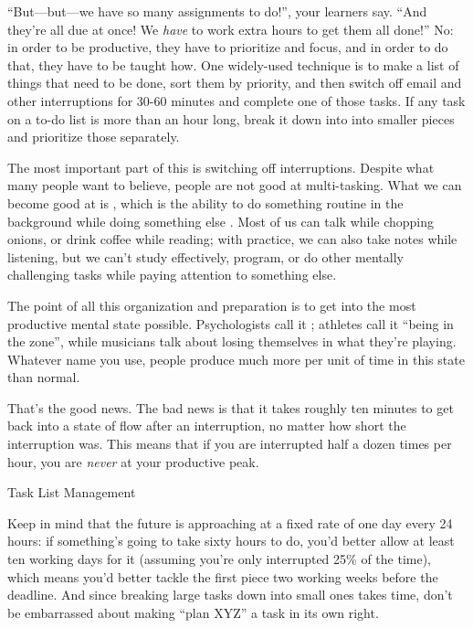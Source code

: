 ``But---but---we have so many assignments to do!'', your learners say.
``And they're all due at once!  We \emph{have} to work extra hours to
get them all done!''  No: in order to be productive, they have to
prioritize and focus, and in order to do that, they have to be taught
how.  One widely-used technique is to make a list of things that need
to be done, sort them by priority, and then switch off email and other
interruptions for 30-60 minutes and complete one of those tasks.  If
any task on a to-do list is more than an hour long, break it down into
into smaller pieces and prioritize those separately.

The most important part of this is switching off interruptions.
Despite what many people want to believe, people are not good at
multi-tasking.  What we can become good at is
, which is the ability to do
something routine in the background while doing something else
\cite{Mill2016a}.  Most of us can talk while chopping onions, or drink
coffee while reading; with practice, we can also take notes while
listening, but we can't study effectively, program, or do other
mentally challenging tasks while paying attention to something else.

The point of all this organization and preparation is to get into the
most productive mental state possible.  Psychologists call it
 \cite{Csik2008}; athletes call it ``being in
the zone'', while musicians talk about losing themselves in what
they're playing.  Whatever name you use, people produce much more per
unit of time in this state than normal.

That's the good news.  The bad news is that it takes roughly ten
minutes to get back into a state of flow after an interruption, no
matter how short the interruption was.  This means that if you are
interrupted half a dozen times per hour, you are \emph{never} at your
productive peak.

\begin{callout}{Task List Management}

  Keep in mind that the future is approaching at a fixed rate of one
  day every 24 hours: if something's going to take sixty hours to do,
  you'd better allow at least ten working days for it (assuming you're
  only interrupted 25\% of the time), which means you'd better tackle
  the first piece two working weeks before the deadline.  And since
  breaking large tasks down into small ones takes time, don't be
  embarrassed about making ``plan XYZ'' a task in its own right.

\end{callout}

